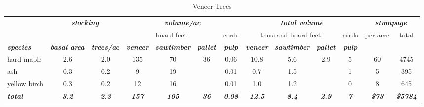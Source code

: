 \documentclass[landscape]{article}
\begin{document}
\begin{table}[H]

\caption{\label{tab:unnamed-chunk-11}Veneer Trees}
\fontsize{10}{12}\selectfont
\begin{tabular}[t]{lcccccccccccc}
\toprule
\multicolumn{1}{c}{\em{\textbf{ }}} & \multicolumn{2}{c}{\em{\textbf{stocking}}} & \multicolumn{4}{c}{\em{\textbf{volume/ac }}} & \multicolumn{4}{c}{\em{\textbf{total volume}}} & \multicolumn{2}{c}{\em{\textbf{stumpage}}} \\
\cmidrule(l{3pt}r{3pt}){2-3} \cmidrule(l{3pt}r{3pt}){4-7} \cmidrule(l{3pt}r{3pt}){8-11} \cmidrule(l{3pt}r{3pt}){12-13}
\multicolumn{3}{c}{ } & \multicolumn{3}{c}{board feet} & \multicolumn{1}{c}{cords} & \multicolumn{3}{c}{thousand board feet} & \multicolumn{1}{c}{cords} & \multicolumn{1}{c}{per acre} & \multicolumn{1}{c}{total} \\
\cmidrule(l{3pt}r{3pt}){4-6} \cmidrule(l{3pt}r{3pt}){7-7} \cmidrule(l{3pt}r{3pt}){8-10} \cmidrule(l{3pt}r{3pt}){11-11} \cmidrule(l{3pt}r{3pt}){12-12} \cmidrule(l{3pt}r{3pt}){13-13}
\rowcolor[HTML]{DCDCDC}  \em{\textbf{species}} & \em{\textbf{basal area}} & \em{\textbf{trees/ac}} & \em{\textbf{veneer}} & \em{\textbf{sawtimber}} & \em{\textbf{pallet}} & \em{\textbf{pulp}} & \em{\textbf{veneer}} & \em{\textbf{sawtimber}} & \em{\textbf{pallet}} & \em{\textbf{pulp}} & \em{\textbf{ }} & \em{\textbf{ }}\\
\midrule
\rowcolor{gray!6}  hard maple & 2.6 & 2.0 & 135 & 70 & 36 & 0.06 & 10.8 & 5.6 & 2.9 & 5 & 60 & 4745\\
 
ash & 0.3 & 0.2 & 9 & 19 &  & 0.01 & 0.7 & 1.5 &  & 1 & 5 & 395\\
 
\rowcolor{gray!6}  yellow birch & 0.3 & 0.2 & 12 & 16 &  & 0.01 & 1.0 & 1.2 &  & 0 & 8 & 645\\
 
\rowcolor[HTML]{DCDCDC}  \em{\textbf{total}} & \em{\textbf{3.2}} & \em{\textbf{2.3}} & \em{\textbf{157}} & \em{\textbf{105}} & \em{\textbf{36}} & \em{\textbf{0.08}} & \em{\textbf{12.5}} & \em{\textbf{8.4}} & \em{\textbf{2.9}} & \em{\textbf{7}} & \em{\textbf{\$73}} & \em{\textbf{\$5784}}\\
\bottomrule
\end{tabular}
\end{table}
\end{document}
